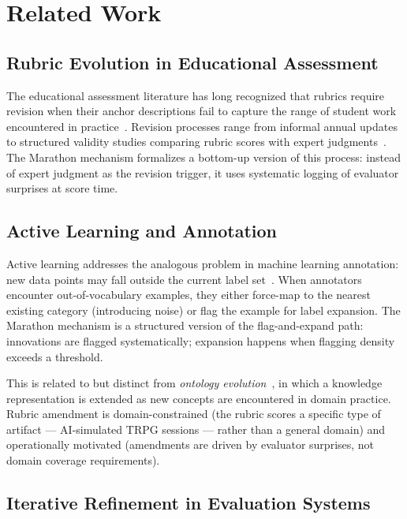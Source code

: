 
\section{Related Work}
\label{sec:related}

\subsection{Rubric Evolution in Educational Assessment}

The educational assessment literature has long recognized that rubrics require
revision when their anchor descriptions fail to capture the range of student work
encountered in practice~\cite{andrade2000, nitko2001}. Revision processes range from
informal annual updates to structured validity studies comparing rubric scores with
expert judgments~\cite{boud2013assessment}. The Marathon mechanism formalizes a
bottom-up version of this process: instead of expert judgment as the revision trigger,
it uses systematic logging of evaluator surprises at score time.

\subsection{Active Learning and Annotation}

Active learning addresses the analogous problem in machine learning annotation: new
data points may fall outside the current label set~\cite{settles2009active}. When
annotators encounter out-of-vocabulary examples, they either force-map to the nearest
existing category (introducing noise) or flag the example for label expansion. The
Marathon mechanism is a structured version of the flag-and-expand path: innovations
are flagged systematically; expansion happens when flagging density exceeds a threshold.

This is related to but distinct from \textit{ontology evolution}~\cite{noy2001ontology},
in which a knowledge representation is extended as new concepts are encountered in
domain practice. Rubric amendment is domain-constrained (the rubric scores a specific
type of artifact --- AI-simulated TRPG sessions --- rather than a general domain) and
operationally motivated (amendments are driven by evaluator surprises, not domain
coverage requirements).

\subsection{Iterative Refinement in Evaluation Systems}

